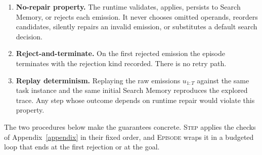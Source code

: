 \begin{enumerate}[leftmargin=*, itemsep=1pt, parsep=1pt]
\item \textbf{No-repair property.} The runtime validates, applies, persists to Search Memory, or rejects each emission. It never chooses omitted operands, reorders candidates, silently repairs an invalid emission, or substitutes a default search decision.
\item \textbf{Reject-and-terminate.} On the first rejected emission the episode terminates with the rejection kind recorded. There is no retry path.
\item \textbf{Replay determinism.} Replaying the raw emissions $u_{1:T}$ against the same task instance and the same initial Search Memory reproduces the explored trace. Any step whose outcome depends on runtime repair would violate this property.
\end{enumerate}

The two procedures below make the guarantees concrete. \textsc{Step} applies the checks of Appendix~\ref{appendix} in their fixed order, and \textsc{Episode} wraps it in a budgeted loop that ends at the first rejection or at the goal.

